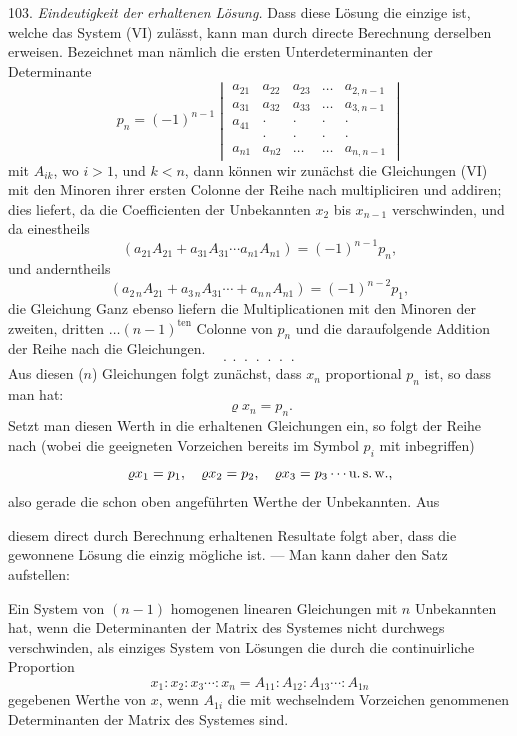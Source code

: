 103. \textit{Eindeutigkeit der erhaltenen Lösung.} Dass diese Lösung die einzige ist, welche das System (VI) zulässt, kann man durch directe Berechnung derselben erweisen. Bezeichnet man nämlich die ersten Unterdeterminanten der Determinante
\[
p_n = (-1)^{n-1}
\begin{vmatrix}
a_{21} & a_{22} & a_{23} & \ldots & a_{2,n-1} \\
a_{31} & a_{32} & a_{33} & \ldots & a_{3,n-1} \\
a_{41} & \cdot & \cdot & \cdot & \cdot \\
 & \cdot & \cdot & \cdot & \cdot \\
a_{n1} & a_{n2} & \ldots & \ldots & a_{n,n-1}
\end{vmatrix}
\]
mit $A_{ik}$, wo $i>1$, und $k<n$, dann können wir zunächst die Gleichungen (VI) mit den Minoren ihrer ersten Colonne der Reihe nach multipliciren und addiren; dies liefert, da die Coefficienten der Unbekannten $x_2$ bis $x_{n-1}$ verschwinden, und da einestheils
\[ (a_{21}A_{21}+a_{31}A_{31}\cdots a_{n1}A_{n1}) = (-1)^{n-1}p_n, \]
und anderntheils
\[ (a_{2\,n}A_{21}+a_{3\,n}A_{31}\cdots+a_{n\,n}A_{n1}) = (-1)^{n-2}p_1, \]
die Gleichung
Ganz ebenso liefern die Multiplicationen mit den Minoren der zweiten, dritten $\ldots(n-1)^{\text{ten}}$ Colonne von $p_n$ und die daraufolgende Addition der Reihe nach die Gleichungen.
\[ \cdot\ \cdot\ \cdot\ \cdot\ \cdot\ \cdot\ \cdot \]
Aus diesen ($n$) Gleichungen folgt zunächst, dass $x_n$ proportional $p_n$ ist, so dass man hat:
\[ \varrho x_n = p_n. \]
Setzt man diesen Werth in die erhaltenen Gleichungen ein, so folgt der Reihe nach (wobei die geeigneten Vorzeichen bereits im Symbol $p_i$ mit inbegriffen)
\[ \varrho x_1 = p_1, \quad \varrho x_2 = p_2, \quad \varrho x_3 = p_3 \cdots \text{u.\,s.\,w.,} \]
also gerade die schon oben angeführten Werthe der Unbekannten. Aus


diesem direct durch Berechnung erhaltenen Resultate folgt aber, dass die gewonnene Lösung die einzig mögliche ist. — Man kann daher den Satz aufstellen:

\glqq Ein System von $(n-1)$ homogenen linearen Gleichungen mit $n$ Unbekannten hat, wenn die Determinanten der Matrix des Systemes nicht durchwegs verschwinden, als einziges System von Lösungen die durch die continuirliche Proportion
\[ x_1:x_2:x_3\cdots:x_n = A_{11}:A_{12}:A_{13}\cdots:A_{1n} \]
gegebenen Werthe von $x$, wenn $A_{1i}$ die mit wechselndem Vorzeichen genommenen Determinanten der Matrix des Systemes sind.\grqq{}

